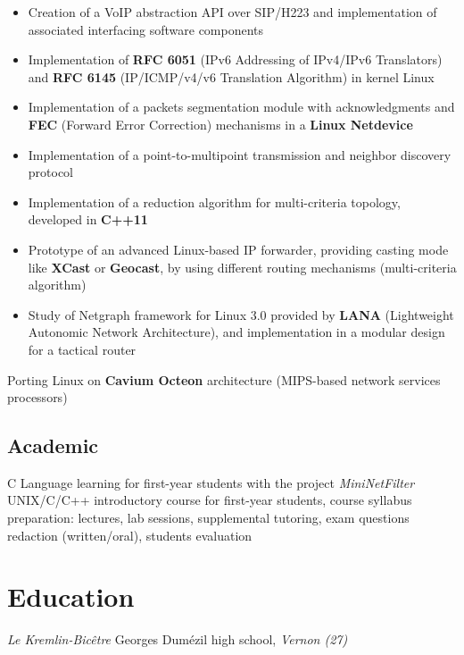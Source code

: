\documentclass[11pt, a4paper]{moderncv}
\begin{document}
{
  \begin{itemize}
    \renewcommand{\labelitemi}{$\bullet$  }
    \item Creation of a VoIP abstraction API over SIP/H223 and implementation of associated interfacing software
      components
    \item Implementation of \textbf{RFC 6051} (IPv6 Addressing of IPv4/IPv6 Translators) and \textbf{RFC 6145} (IP/ICMP/v4/v6
      Translation Algorithm) in kernel Linux
    \item Implementation of a packets segmentation module with acknowledgments and \textbf{FEC} (Forward Error Correction)
      mechanisms in a \textbf{Linux Netdevice}
    \item Implementation of a point-to-multipoint transmission and neighbor discovery protocol
    \item Implementation of a reduction algorithm for multi-criteria topology, developed in \textbf{C++11}
    \item Prototype of an advanced Linux-based IP forwarder, providing casting mode like \textbf{XCast} or \textbf{Geocast},
      by using different routing mechanisms (multi-criteria algorithm)
    \item Study of Netgraph framework for Linux 3.0 provided by \textbf{LANA} (Lightweight Autonomic Network Architecture),
      and implementation in a modular design for a tactical router
  \end{itemize}
}
{
	Porting Linux on \textbf{Cavium Octeon} architecture (MIPS-based network services processors)
}

\subsection{Academic}
		{C Language learning for first-year students with the project \textit{MiniNetFilter}}
		{UNIX/C/C++ introductory course for first-year students, course syllabus preparation: lectures, lab sessions,
			supplemental tutoring, exam questions redaction (written/oral), students evaluation}

\section{Education}
			{\textit{Le Kremlin-Bic\^etre}}{}{}
			{Georges Dumézil high school, \textit{Vernon (27)}}{}{}
\end{document}
